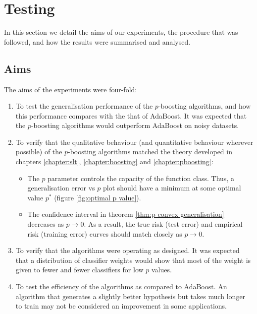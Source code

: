 \section{Testing}

In this section we detail the aims of our experiments, the procedure
that was followed, and how the results were summarised and analysed.

\subsection{Aims}
The aims of the experiments were four-fold:
%
\begin{enumerate}
\item	To test the generalisation performance of the $p$-boosting
	algorithms, and how this performance compares with the
	that of AdaBoost.  It was expected that the $p$-boosting
	algorithms would outperform AdaBoost on noisy datasets.

\item	To verify that the qualitative behaviour (and quantitative
	behaviour wherever possible) of the $p$-boosting algorithms
	matched the theory developed in chapters \ref{chapter:slt},
	\ref{chapter:boosting} and \ref{chapter:pboosting}:
	\begin{itemize}
	\item	The $p$ parameter controls the capacity of the
		function class.  Thus, a generalisation error vs $p$
		plot should have a minimum at some optimal value
		$p^{\ast}$ (figure \ref{fig:optimal p value}).
	\item	The confidence interval in theorem \ref{thm:p convex
		generalisation} decreases as $p \rightarrow 0$.  As a
		result, the true risk (test error) and empirical risk 
		(training error) curves should match closely as $p
		\rightarrow 0$.
	\end{itemize}
	
\item	To verify that the algorithms were operating as designed.
	It was expected that a distribution of classifier weights
	would show that most of the weight is given to fewer and fewer
	classifiers for low $p$ values.

\item	To test the efficiency of the algorithms as compared to
	AdaBoost.  An algorithm that generates a slightly better
	hypothesis but takes much longer to train may not be
	considered an improvement in some applications.
\end{enumerate}


